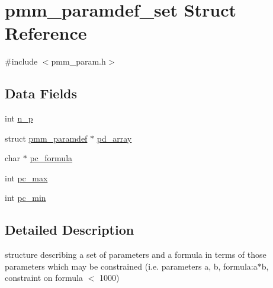 \hypertarget{structpmm__paramdef__set}{\section{pmm\-\_\-paramdef\-\_\-set Struct Reference}
\label{structpmm__paramdef__set}
}


{\ttfamily \#include $<$pmm\-\_\-param.\-h$>$}

\subsection*{Data Fields}
\begin{DoxyCompactItemize}
\item 
int \hyperlink{structpmm__paramdef__set_aaf2e3c0d854fddee13df808d7b8c13e8}{n\-\_\-p}
\item 
struct \hyperlink{structpmm__paramdef}{pmm\-\_\-paramdef} $\ast$ \hyperlink{structpmm__paramdef__set_a21002ef85eabb0d96750c6a0cdce96c0}{pd\-\_\-array}
\item 
char $\ast$ \hyperlink{structpmm__paramdef__set_a464c3f385beb49086fbea74a3ce229d0}{pc\-\_\-formula}
\item 
int \hyperlink{structpmm__paramdef__set_a9749805cd8bc1b6ccd757cc9148683d8}{pc\-\_\-max}
\item 
int \hyperlink{structpmm__paramdef__set_ab69c42d0bb271fb104d45d5f9266e645}{pc\-\_\-min}
\end{DoxyCompactItemize}


\subsection{Detailed Description}
structure describing a set of parameters and a formula in terms of those parameters which may be constrained (i.\-e. parameters a, b, formula\-:a$\ast$b, constraint on formula $<$ 1000) 

